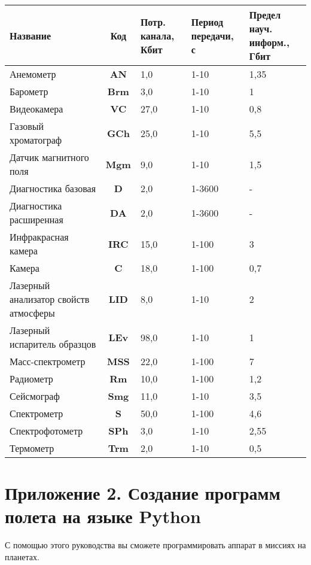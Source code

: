 \documentclass[12pt,a4paper]{article}
\begin{document}
\begin{center}
\begin{longtable}{ |p{4cm}|c|p{3cm}|p{3cm}|p{3cm}| }
  \hline
  \textbf{Название} & \textbf{Код} &
  \textbf{Потр. канала, Кбит} & \textbf{Период передачи, с} &
  \textbf{Предел науч. информ., Гбит}\\
  \hline
  \endhead
Анемометр & \textbf{AN} & 1,0 & 1-10 & 1,35 \\
\hline
Барометр & \textbf{Brm} & 3,0 & 1-10 & 1 \\
\hline
Видеокамера & \textbf{VC} & 27,0 & 1-10 & 0,8 \\
\hline
Газовый хроматограф & \textbf{GCh} & 25,0 & 1-10 & 5,5 \\
\hline
Датчик магнитного поля & \textbf{Mgm} & 9,0 & 1-10 & 1,5 \\
\hline
Диагностика базовая & \textbf{D} & 2,0 & 1-3600 & - \\
\hline
Диагностика расширенная & \textbf{DA} & 2,0 & 1-3600 & - \\
\hline
Инфракрасная камера & \textbf{IRC} & 15,0 & 1-100 & 3 \\
\hline
Камера & \textbf{C} & 18,0 & 1-100 & 0,7 \\
\hline
Лазерный анализатор свойств атмосферы & \textbf{LID} & 8,0 & 1-10 & 2 \\
\hline
Лазерный испаритель образцов & \textbf{LEv} & 98,0 & 1-10 & 1 \\
\hline
Масс-спектрометр & \textbf{MSS} & 22,0 & 1-100 & 7 \\
\hline
Радиометр & \textbf{Rm} & 10,0 & 1-100 & 1,2 \\
\hline
Сейсмограф & \textbf{Smg} & 11,0 & 1-10 & 3,5 \\
\hline
Спектрометр & \textbf{S} & 50,0 & 1-100 & 4,6 \\
\hline
Спектрофотометр & \textbf{SPh} & 3,0 & 1-10 & 2,55 \\
\hline
Термометр & \textbf{Trm} & 2,0 & 1-10 & 0,5 \\
\hline
\end{longtable}
\end{center}

\section*{Приложение 2. Создание программ полета на языке Python}
\label{Sec:Python}

С помощью этого руководства вы сможете программировать аппарат в миссиях на планетах.
\end{document}
